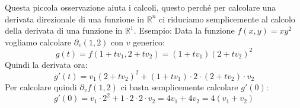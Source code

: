 Questa piccola osservazione aiuta i calcoli, questo perché per calcolare una 
derivata direzionale di una funzione in $\mathbb{R}^n$ ci riduciamo 
semplicemente al calcolo della derivata di una funzione in $\mathbb{R}^1$. 
Esempio: Data la funzione $f(x, y) = xy^2$ vogliamo calcolare $\partial_v 
(1, 2)$ con $v$ generico:
\begin{equation*}
	g(t) = f(1 + tv_1, 2 + tv_2) = (1 + tv_1)(2 + tv_2)^2
\end{equation*}
Quindi la derivata ora:
\begin{equation*}
	g'(t) = v_1(2 + tv_2)^2 + (1+tv_1) \cdot 2 \cdot (2 + tv_2) \cdot v_2
\end{equation*}
Per calcolare quindi $\partial_v f(1, 2)$ ci basta semplicemente calcolare 
$g'(0)$:
\begin{equation*}
	g'(0) = v_1 \cdot 2^2 + 1 \cdot 2 \cdot 2 \cdot v_2 = 4v_1 + 4v_2 = 
	4(v_1 + v_2)
\end{equation*}


